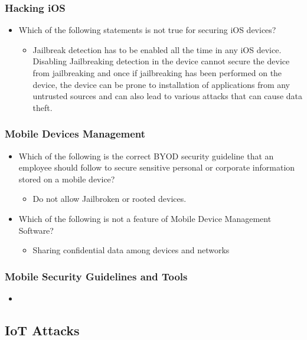 \subsubsection{Hacking iOS}
\begin{itemize}
    \item Which of the following statements is not true for securing iOS devices?
    \begin{itemize}
        \item Jailbreak detection has to be enabled all the time in any iOS device. Disabling Jailbreaking detection in the device cannot secure the device from jailbreaking and once if jailbreaking has been performed on the device, the device can be prone to installation of applications from any untrusted sources and can also lead to various attacks that can cause data theft.
    \end{itemize}
\end{itemize}
\subsubsection{Mobile Devices Management}
\begin{itemize}
    \item Which of the following is the correct BYOD security guideline that an employee should follow to secure sensitive personal or corporate information stored on a mobile device?
    \begin{itemize}
        \item Do not allow Jailbroken or rooted devices.
    \end{itemize}
    \item Which of the following is not a feature of Mobile Device Management Software?
    \begin{itemize}
        \item Sharing confidential data among devices and networks
    \end{itemize}
\end{itemize}
\subsubsection{Mobile Security Guidelines and Tools}
\begin{itemize}
    \item 
\end{itemize}


\subsection{IoT Attacks}
